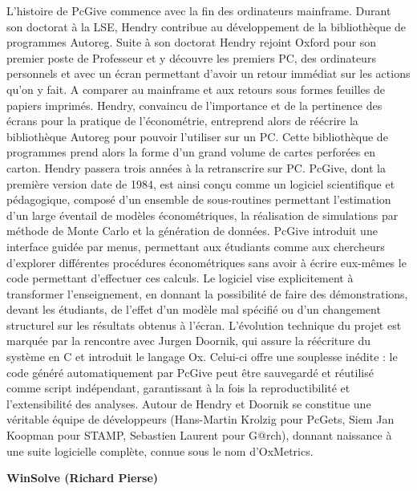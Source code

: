 L’histoire de PcGive commence avec la fin des ordinateurs mainframe. Durant son doctorat à la LSE, Hendry contribue au développement de la bibliothèque de programmes Autoreg. Suite à son doctorat Hendry rejoint Oxford pour son premier poste de Professeur et y découvre les premiers PC, des ordinateurs personnels et avec un écran permettant d'avoir un retour immédiat sur les actions qu'on y fait. A comparer au mainframe et aux retours sous formes feuilles de papiers imprimés. Hendry, convaincu de l'importance et de la pertinence des écrans pour la pratique de l'économétrie, entreprend alors de réécrire la bibliothèque Autoreg pour pouvoir l'utiliser sur un PC. Cette bibliothèque de programmes prend alors la forme d'un grand volume de cartes perforées en carton. Hendry passera trois années à la retranscrire sur PC.
PcGive, dont la première version date de 1984, est ainsi conçu comme un logiciel scientifique et pédagogique, composé d'un ensemble de sous-routines permettant l’estimation d’un large éventail de modèles économétriques, la réalisation de simulations par méthode de Monte Carlo et la génération de données. PcGive introduit une interface guidée par menus, permettant aux étudiants comme aux chercheurs d’explorer différentes procédures économétriques sans avoir à écrire eux-mêmes le code permettant d'effectuer ces calculs. Le logiciel vise explicitement à transformer l’enseignement, en donnant la possibilité de faire des démonstrations, devant les étudiants, de l’effet d’un modèle mal spécifié ou d’un changement structurel sur les résultats obtenus à l'écran.
L’évolution technique du projet est marquée par la rencontre avec Jurgen Doornik, qui assure la réécriture du système en C et introduit le langage Ox. Celui-ci offre une souplesse inédite : le code généré automatiquement par PcGive peut être sauvegardé et réutilisé comme script indépendant, garantissant à la fois la reproductibilité et l’extensibilité des analyses. Autour de Hendry et Doornik se constitue une véritable équipe de développeurs (Hans-Martin Krolzig pour PcGets, Siem Jan Koopman pour STAMP, Sebastien Laurent pour G@rch), donnant naissance à une suite logicielle complète, connue sous le nom d’OxMetrics.



\textbf{WinSolve (Richard Pierse)}

